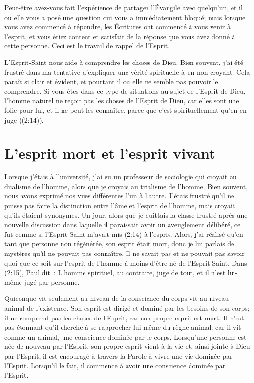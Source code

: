 Peut-être avez-vous fait l'expérience de partager l'Évangile avec quelqu'un,
 et il ou elle vous a posé une question qui vous a immédiatement bloqué;
 mais lorsque vous avez commencé à répondre, les Écritures ont commencé
 à vous venir à l'esprit, et vous étiez content et satisfait de la réponse
 que vous avez donné à cette personne. Ceci est le travail de rappel de l'Esprit.

L'Esprit-Saint nous aide à comprendre les choses de Dieu.
 Bien souvent, j'ai été frustré dans ma tentative d'expliquer
 une vérité spirituelle à un non croyant.
 Cela paraît si clair et évident, et pourtant il ou elle ne semble pas
 pouvoir le comprendre.
 Si vous êtes dans ce type de situations au sujet de l'Esprit de Dieu,
 l'homme naturel \og ne reçoit pas les choses de l'Esprit de Dieu,
 car elles sont une folie pour lui, et il ne peut les connaître, 
 parce que c'est spirituellement qu'on en juge \fg{}
 ((2:14)).


\section*{L'esprit mort et l'esprit vivant}

Lorsque j'étais à l'université, j'ai eu un professeur de sociologie
 qui croyait au dualisme de l'homme, alors que je croyais au trialisme de l'homme.
 Bien souvent, nous avons exprimé nos vues différentes l'un à l'autre.
 J'étais frustré qu'il ne puisse pas faire la distinction entre l'âme
 et l'esprit de l'homme, mais croyait qu'ils étaient synonymes.
 Un jour, alors que je quittais la classe frustré
 après une nouvelle discussion dans laquelle il paraissait
 avoir un aveuglement délibéré, ce fut comme si l'Esprit-Saint
 m'avait mis (2:14) à l'esprit.
 Alors, j'ai réalisé qu'en tant que personne non régénérée,
 son esprit était mort, donc je lui parlais de mystères qu'il ne pouvait
 pas connaître.
 Il ne savait pas et ne pouvait pas savoir quoi que ce soit sur l'esprit
 de l'homme à moins d'être né de l'Esprit-Saint.
 Dans (2:15), Paul dit~:
 \og L'homme spirituel, au contraire, juge de tout,
 et il n'est lui-même jugé par personne. \fg{}

Quiconque vit seulement au niveau de la conscience du corps
 vit au niveau animal de l'existence.
 Son esprit est dirigé et dominé par les besoins de son corps;
 il ne comprend pas les choses de l'Esprit, car son propre esprit est mort.
 Il n'est pas étonnant qu'il cherche à se rapprocher lui-même
 du règne animal, car il vit comme un animal,
 une conscience dominée par le corps.
 Lorsqu'une personne est née de nouveau par l'Esprit,
 son propre esprit vient à la vie et, ainsi jointe à Dieu par l'Esprit,
 il est encouragé à travers la Parole à vivre une vie dominée par l'Esprit.
 Lorsqu'il le fait, il commence à avoir une conscience dominée par l'Esprit.


